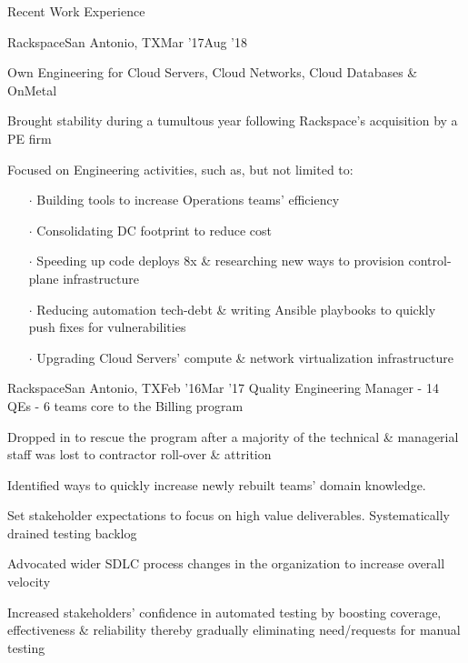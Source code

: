 \documentclass{resume} %
\begin{document}
\begin{rSection}{Recent Work Experience}
\begin{rSubsection}{Rackspace}{San Antonio, TX}{Mar '17}{Aug '18}
\item Own Engineering for Cloud Servers, Cloud Networks, Cloud Databases \& OnMetal
\item Brought stability during a tumultous year following Rackspace's acquisition by a PE firm
\item Focused on Engineering activities, such as, but not limited to:
  \vspace{-0.5em}
  \begin{itemize}  \itemsep0.5pt \parskip0pt
    \item[$\cdot$] Building tools to increase Operations teams' efficiency
    \item[$\cdot$] Consolidating DC footprint to reduce cost
    \item[$\cdot$] Speeding up code deploys 8x \& researching new ways to provision control-plane infrastructure
    \item[$\cdot$] Reducing automation tech-debt \& writing Ansible playbooks to quickly push fixes for vulnerabilities
    \item[$\cdot$] Upgrading Cloud Servers' compute \& network virtualization infrastructure
\end{itemize}
  
\end{rSubsection}
  
\begin{rSubsection}{Rackspace}{San Antonio, TX}{Feb '16}{Mar '17}
{Quality Engineering Manager - 14 QEs - 6 teams core to the Billing program}
  
\item Dropped in to rescue the program after a majority of the technical \& managerial staff was lost to contractor roll-over \& attrition
\item Identified ways to quickly increase newly rebuilt teams' domain knowledge. %
\item Set stakeholder expectations to focus on high value deliverables. Systematically drained testing backlog
\item Advocated wider SDLC process changes in the organization to increase overall velocity
\item Increased stakeholders' confidence in automated testing by boosting coverage, effectiveness \& reliability thereby gradually eliminating need/requests for manual testing
  

\end{rSubsection}
\end{rSection}
\end{document}

